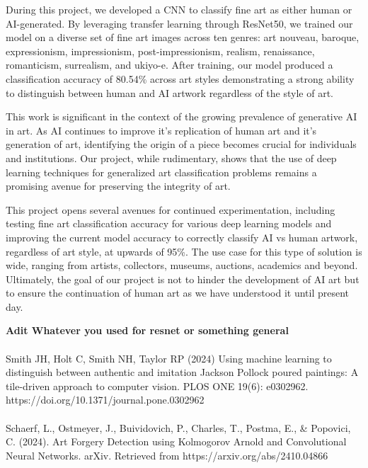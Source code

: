 \par During this project, we developed a CNN to classify fine art as either human or AI-generated. By leveraging transfer learning through ResNet50, we trained our model on a diverse set of fine art images across ten genres: art nouveau, baroque, expressionism, impressionism, post-impressionism, realism, renaissance, romanticism, surrealism, and ukiyo-e. After training, our model produced a classification accuracy of 80.54\% across art styles demonstrating a strong ability to distinguish between human and AI artwork regardless of the style of art. 
\\
\par This work is significant in the context of the growing prevalence of generative AI in art. As AI continues to improve it's replication of human art and it's generation of art, identifying the origin of a piece becomes crucial for individuals and institutions. Our project, while rudimentary, shows that the use of deep learning techniques for generalized art classification problems remains a promising avenue for preserving the integrity of art.
\\
\par This project opens several avenues for continued experimentation, including testing fine art classification accuracy for various deep learning models and improving the current model accuracy to correctly classify AI vs human artwork, regardless of art style, at upwards of 95\%. The use case for this type of solution is wide, ranging from artists, collectors, museums, auctions, academics and beyond. Ultimately, the goal of our project is not to hinder the development of AI art but to ensure the continuation of human art as we have understood it until present day.


{\small

 
\textbf{Adit Whatever you used for resnet or something general} \\
\\
Smith JH, Holt C, Smith NH, Taylor RP (2024) Using machine learning to distinguish between authentic and imitation Jackson Pollock poured paintings: A tile-driven approach to computer vision. PLOS ONE 19(6): e0302962. https://doi.org/10.1371/journal.pone.0302962 \\
\\
Schaerf, L., Ostmeyer, J., Buividovich, P., Charles, T., Postma, E., & Popovici, C. (2024). Art Forgery Detection using Kolmogorov Arnold and Convolutional Neural Networks. arXiv. Retrieved from https://arxiv.org/abs/2410.04866

}

